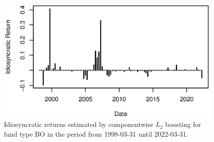 \documentclass[12pt]{article}
\begin{document}
\begin{figure}[H]
	\centering
	\includegraphics{Figures/msci_market_factors/XErrorSeriesBO}
	\caption{Idiosyncratic returns estimated by componentwise $L_2$ boosting for fund type BO in the period from 1998-03-31 until 2022-03-31.}
	\label{fig:clb_idio}
\end{figure}
\end{document}

